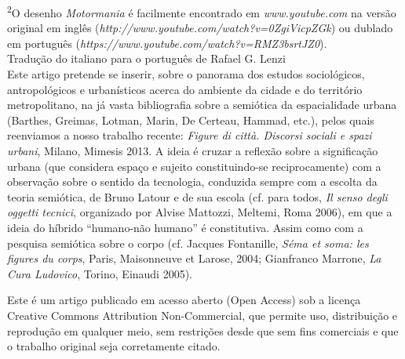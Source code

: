 \footnotesize{\textsuperscript{2}O desenho \textit{Motormania} é facilmente encontrado em \textit{www.\allowbreak{}youtube.\allowbreak{}com} na versão original em inglês (\allowbreak{}\textit{http:\allowbreak{}\fshyp{}\fshyp{}www.\allowbreak{}youtube.\allowbreak{}com\fshyp{}watch?v=0ZgiVicpZGk})\allowbreak{} ou dublado em português (\allowbreak{}\textit{https:\allowbreak{}\fshyp{}\fshyp{}www.\allowbreak{}youtube.\allowbreak{}com\fshyp{}watch?v=RMZ3bsrtJZ0})\allowbreak{}.\allowbreak{}\\Tradução do italiano para o português de Rafael G.\allowbreak{} Lenzi\\Este artigo pretende se inserir,\allowbreak{} sobre o panorama dos estudos sociológicos,\allowbreak{} antropológicos e urbanísticos acerca do ambiente da cidade e do território metropolitano,\allowbreak{} na já vasta bibliografia sobre a semiótica da espacialidade urbana (\allowbreak{}Barthes,\allowbreak{} Greimas,\allowbreak{} Lotman,\allowbreak{} Marin,\allowbreak{} De Certeau,\allowbreak{} Hammad,\allowbreak{} etc.\allowbreak{})\allowbreak{},\allowbreak{} pelos quais reenviamos a nosso trabalho recente:\allowbreak{} \textit{Figure di città.\allowbreak{} Discorsi sociali e spazi urbani},\allowbreak{} Milano,\allowbreak{} Mimesis 2013.\allowbreak{} A ideia é cruzar a reflexão sobre a significação urbana (\allowbreak{}que considera espaço e sujeito constituindo-\allowbreak{}se reciprocamente)\allowbreak{} com a observação sobre o sentido da tecnologia,\allowbreak{} conduzida sempre com a escolta da teoria semiótica,\allowbreak{} de Bruno Latour e de sua escola (\allowbreak{}cf.\allowbreak{} para todos,\allowbreak{} \textit{Il senso degli oggetti tecnici},\allowbreak{} organizado por Alvise Mattozzi,\allowbreak{} Meltemi,\allowbreak{} Roma 2006)\allowbreak{},\allowbreak{} em que a ideia do híbrido “humano-\allowbreak{}não humano” é constitutiva.\allowbreak{} Assim como com a pesquisa semiótica sobre o corpo (\allowbreak{}cf.\allowbreak{} Jacques Fontanille,\allowbreak{} \textit{Séma et soma:\allowbreak{} les figures du corps},\allowbreak{} Paris,\allowbreak{} Maisonneuve et Larose,\allowbreak{} 2004; Gianfranco Marrone,\allowbreak{} \textit{La Cura Ludovico},\allowbreak{} Torino,\allowbreak{} Einaudi 2005)\allowbreak{}.\allowbreak{}\\}

\medskip\par\noindent
\footnotesize{Este é um artigo publicado em acesso aberto (Open Access) sob a licença Creative Commons Attribution Non-Commercial, que permite uso, distribuição e reprodução em qualquer meio, sem restrições desde que sem fins comerciais e que o trabalho original seja corretamente citado.}

